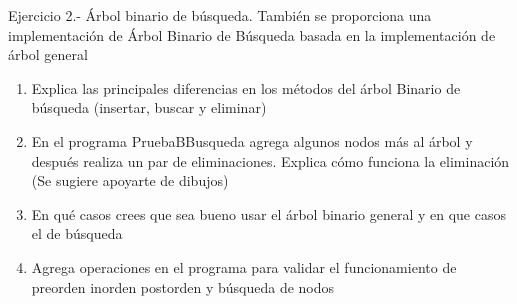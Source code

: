 \begin{ejercicio}{Ejercicio 2.- Árbol binario de búsqueda.}
    También se proporciona una implementación de Árbol Binario de Búsqueda basada en la implementación
de árbol general
\begin{enumerate}
    \item Explica las principales diferencias en los métodos del árbol Binario de búsqueda (insertar, buscar
y eliminar)
    \item En el programa PruebaBBusqueda agrega algunos nodos más al árbol y después realiza un par de
eliminaciones. Explica cómo funciona la eliminación (Se sugiere apoyarte de dibujos)
    \item En qué casos crees que sea bueno usar el árbol binario general y en que casos el de búsqueda
    \item Agrega operaciones en el programa para validar el funcionamiento de preorden inorden
postorden y búsqueda de nodos
\end{enumerate}
\end{ejercicio}
